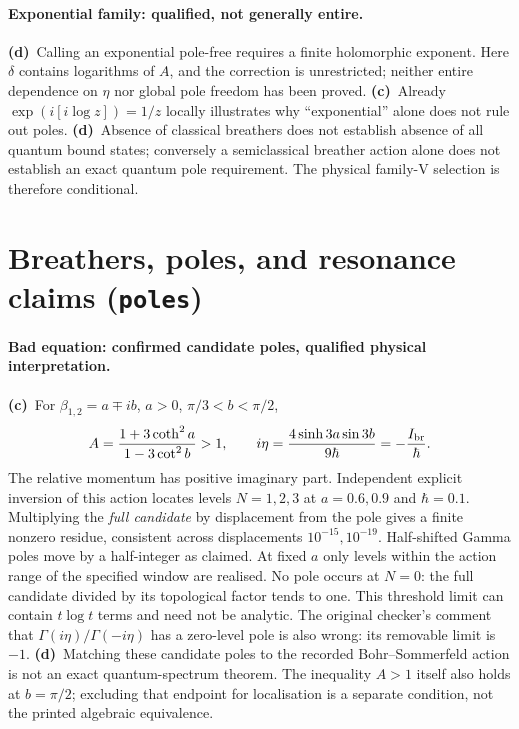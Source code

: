 \documentclass[11pt,a4paper]{article}
\newcommand{\Lc}{\textbf{(c)}\ }
\newcommand{\Ld}{\textbf{(d)}\ }
\begin{document}
\paragraph{Exponential family: qualified, not generally entire.}
\Ld Calling an exponential pole-free requires a finite holomorphic exponent.
Here $\delta$ contains logarithms of $A$, and the correction is unrestricted;
neither entire dependence on $\eta$ nor global pole freedom has been proved.
\Lc Already $\exp(i[i\log z])=1/z$ locally illustrates why ``exponential''
alone does not rule out poles. \Ld Absence of classical breathers does not
establish absence of all quantum bound states; conversely a semiclassical
breather action alone does not establish an exact quantum pole requirement.
The physical family-V selection is therefore conditional.

\section{Breathers, poles, and resonance claims (\texttt{poles})}
\paragraph{Bad equation: confirmed candidate poles, qualified physical interpretation.}
\Lc For $\beta_{1,2}=a\mp ib$, $a>0$, $\pi/3<b<\pi/2$,
\begin{equation}
 A=\frac{1+3\coth^2a}{1-3\cot^2b}>1,\qquad
 i\eta=\frac{4\sinh3a\sin3b}{9\hbar}=-\frac{I_{\rm br}}{\hbar}.
\end{equation}
The relative momentum has positive imaginary part. Independent explicit
inversion of this action locates levels $N=1,2,3$ at $a=0.6,0.9$ and
$\hbar=0.1$. Multiplying the \emph{full candidate} by displacement from the
pole gives a finite nonzero residue, consistent across displacements
$10^{-15},10^{-19}$. Half-shifted Gamma poles move by a half-integer as
claimed. At fixed $a$ only levels within the action range of the specified
window are realised. No pole occurs at $N=0$: the full candidate divided
by its topological factor tends to one. This threshold limit can contain
$t\log t$ terms and need not be analytic. The original checker's comment
that $\Gamma(i\eta)/\Gamma(-i\eta)$ has a zero-level pole is also wrong:
its removable limit is $-1$.
\Ld Matching these candidate poles to the recorded Bohr--Sommerfeld action
is not an exact quantum-spectrum theorem. The inequality $A>1$ itself also
holds at $b=\pi/2$; excluding that endpoint for localisation is a separate
condition, not the printed algebraic equivalence.
\end{document}
